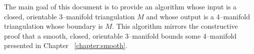 \label{chapter:introduction}

The main goal of this document is to provide an algorithm whose input is a closed, orientable 3--manifold triangulation $M$ and whose output is a 4--manifold triangulation whose boundary is $M$.
This algorithm mirrors the constructive proof that a smooth, closed, orientable 3--manifold bounds some 4--manifold presented in Chapter ~\ref{chapter:smooth}.